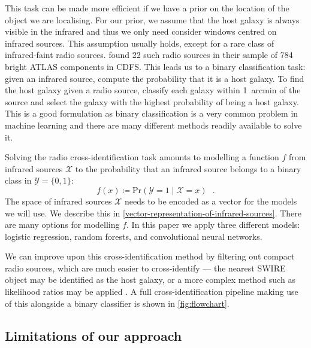 \documentclass[fleqn,usenatbib,usedcolumn]{mnras}
\begin{document}
    This task can be made more efficient if we have a prior on the location of
    the object we are localising. For our prior, we assume that the host galaxy
    is always visible in the infrared and thus we only need consider windows
    centred on infrared sources. This assumption usually holds, except for a
    rare class of infrared-faint radio sources. \citet{norris06} found 22 such
    radio sources in their sample of 784 bright ATLAS components in CDFS. This
    leads us to a binary classification task: given an infrared source, compute
    the probability that it is a host galaxy. To find the host galaxy given a
    radio source, classify each galaxy within 1~arcmin of the source and select
    the galaxy with the highest probability of being a host galaxy. This is a
    good formulation as binary classification is a very common problem in
    machine learning and there are many different methods readily available to
    solve it.

    Solving the radio cross-identification task amounts to modelling a function
    $f$ from infrared sources $\mathcal{X}$ to the probability that an infrared
    source belongs to a binary class in $\mathcal{Y} = \{0, 1\}$:
    \begin{equation}
        f(x) \coloneqq \text{Pr}\left(\mathcal{Y} = 1 \mid \mathcal X = x\right)\,\,\,\,.
    \end{equation}
    The space of infrared sources $\mathcal{X}$ needs to be encoded as a vector
    for the models we will use. We describe this in
    \autoref{vector-representation-of-infrared-sources}. There are many options
    for modelling $f$. In this paper we apply three different models: logistic
    regression, random forests, and convolutional neural networks.

    We can improve upon this cross-identification method by filtering out
    compact radio sources, which are much easier to cross-identify --- the
    nearest SWIRE object may be identified as the host galaxy, or a more
    complex method such as likelihood ratios may be applied
    \citep[see][]{weston17}. A full cross-identification pipeline making use
    of this alongside a binary classifier is shown in \autoref{fig:flowchart}.

  \subsection{Limitations of our approach}
    \label{sec:limitations}
\end{document}
